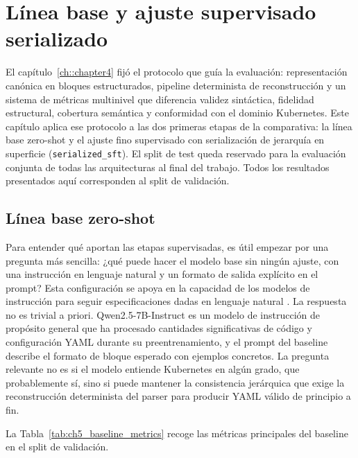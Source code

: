 %
\chapter{Línea base y ajuste supervisado serializado}
\label{ch::chapter5}

El capítulo~\ref{ch::chapter4} fijó el protocolo que guía la evaluación: representación canónica
en bloques estructurados, pipeline determinista de reconstrucción y un sistema de métricas multinivel
que diferencia validez sintáctica, fidelidad estructural, cobertura semántica y conformidad con el
dominio Kubernetes. Este capítulo aplica ese protocolo a las dos primeras etapas de la comparativa:
la línea base zero-shot y el ajuste fino supervisado con serialización de jerarquía en superficie
(\texttt{serialized\_sft}). El split de test queda reservado para la evaluación conjunta de todas
las arquitecturas al final del trabajo. Todos los resultados presentados aquí corresponden
al split de validación.

\section{Línea base zero-shot}
\label{sec:ch5_baseline}

Para entender qué aportan las etapas supervisadas, es útil empezar por una pregunta más sencilla:
¿qué puede hacer el modelo base sin ningún ajuste, con una instrucción en lenguaje natural y un
formato de salida explícito en el prompt? Esta configuración se apoya en la capacidad de los modelos de instrucción para seguir especificaciones dadas en lenguaje natural \citep{wei2022scaling, liu2023pretrain}. La respuesta no es trivial a priori.
Qwen2.5-7B-Instruct \citep{qwen2024qwen25} es un modelo de instrucción de propósito general que ha procesado cantidades
significativas de código y configuración YAML durante su preentrenamiento, y el prompt del baseline
describe el formato de bloque esperado con ejemplos concretos. La pregunta relevante no es si el
modelo entiende Kubernetes en algún grado, que probablemente sí, sino si puede mantener la
consistencia jerárquica que exige la reconstrucción determinista del parser para producir
YAML válido de principio a fin.

La Tabla~\ref{tab:ch5_baseline_metrics} recoge las métricas principales del baseline
en el split de validación.

